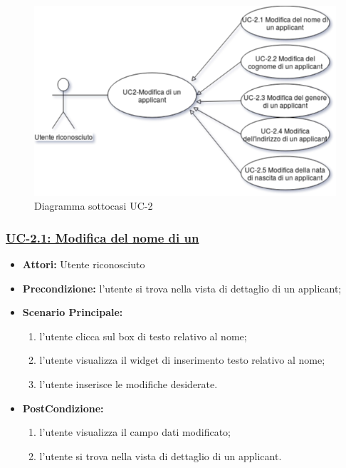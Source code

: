 \begin{figure}[!h] 
	\centering 
	\includegraphics[width=1\columnwidth]{immagini/usecase/UC3} 
	\caption{Diagramma sottocasi UC-2}
	\label{figura:uc-3}
\end{figure}


\subsubsection{\underline{UC-2.1: Modifica del nome di un \applicant}}
\begin{itemize}
	\item \textbf{Attori:} Utente riconosciuto
	\item \textbf{Precondizione:}  l'utente si trova nella vista di dettaglio di un applicant;
	\item \textbf{Scenario Principale:}
	\begin{enumerate}
		\item l'utente clicca sul box di testo relativo al nome;
		\item l'utente visualizza il  widget di inserimento testo relativo al nome;
		\item l'utente inserisce le modifiche desiderate.
	\end{enumerate}
	\item \textbf{PostCondizione:} 
	\begin{enumerate}
		\item l'utente visualizza il campo dati modificato;
		\item l'utente si trova nella vista di dettaglio di un applicant.
	\end{enumerate}
	
\end{itemize}

